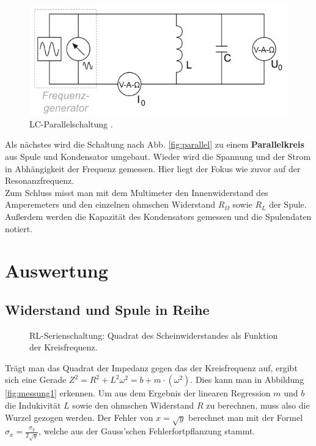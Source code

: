 \documentclass[12pt,a4paper,titlepage,headinclude,bibtotoc]{scrartcl}
\begin{document}
\begin{figure}[!htb]
	\centering
	\includegraphics[scale=1.0]{parallel.png}
	\caption{LC-Parallelschaltung \cite[Datum: 03.10.14]{LP14}.}
	\label{fig:parallel}
\end{figure}


Als nächstes wird die Schaltung nach Abb. \eqref{fig:parallel} zu einem \textbf{Parallelkreis} aus Spule und Kondensator umgebaut.
Wieder wird die Spannung und der Strom in Abhängigkeit der Frequenz gemessen.
Hier liegt der Fokus wie zuvor auf der Resonanzfrequenz.\\

Zum Schluss misst man mit dem Multimeter den Innenwiderstand des Amperemeters und den einzelnen ohmschen Widerstand $R_\Omega$ sowie $R_L$ der Spule.
Außerdem werden die Kapazität des Kondensators gemessen und die Spulendaten notiert. 

\section{Auswertung}
\label{sec:auswertung}
\subsection{Widerstand und Spule in Reihe}
\begin{figure}[!htb]
	\centering
	
	\caption{RL-Serienschaltung: Quadrat des Scheinwiderstandes als Funktion der Kreisfrequenz.}
	\label{fig:messung1}
\end{figure}
Trägt man das Quadrat der Impedanz gegen das der Kreisfrequenz auf, ergibt sich eine Gerade $Z^2=R^2+L^2\omega^2=b+m\cdot(\omega^2)$.
Dies kann man in Abbildung \eqref{fig:messung1} erkennen.
Um aus dem Ergebnis der linearen Regression $m$ und $b$ die Indukivität  $L$ sowie den ohmschen Widerstand $R$ zu berechnen, muss also die Wurzel gezogen werden.
Der Fehler von $x=\sqrt{y}$ berechnet man mit der Formel $\sigma_x=\frac{\sigma_y}{2\sqrt{y}}$, welche aus der Gauss'schen  Fehlerfortpflanzung stammt.
\end{document}
